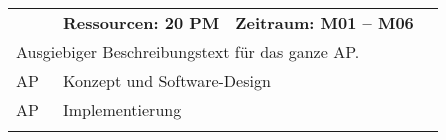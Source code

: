 \providecommand{\setTableCellSepWidth}{}\renewcommand{\setTableCellSepWidth}{\let\tableCellSepWidth\relax\newlength{\tableCellSepWidth}\setlength{\tableCellSepWidth}{\arrayrulewidth+2\tabcolsep}}
%
%
%
%
{%
\providecommand{\dispLhead}{}%
\providecommand{\dispThead}{}%
\providecommand{\dispNfo}{}%
\renewcommand{\dispLhead}[1]{\bfseries#1}%
\renewcommand{\dispThead}[1]{\color{white}\bfseries#1}%
\renewcommand{\dispNfo}[1]{\bfseries#1}%
%
%
%
%
%
%
%
%
%
\setlength{\tabcolsep}{4pt}%
\renewcommand{\arraystretch}{1.5}%
\renewcommand\theadfont{\bfseries}%
\arrayrulewidth=0.8pt%
%
\setlength{\extrarowheight}{0ex}%
\centering%
\footnotesize%
\edef\columnNumber{6}%
\setTableTextWidth{\tabletextw}{\columnNumber}%
%
%
\begin{longtable}{|p{0.08\tabletextw}|p{0.17\tabletextw}|p{0.15\tabletextw}|p{0.2\tabletextw}|p{0.2\tabletextw}|p{0.2\tabletextw}|}%
\hline%
\rowcolor{cell_Head}
	\multicolumn{\columnNumber}{|l|}{\dispThead{AP~\APnext: Konzept, Entwicklung \& Implementierung}}\\
\hline
\rowcolor{cell_accentuated}
	\multicolumn{2}{|p{0.3\tabletextwThree}|}{\dispNfo{AP-Leitung: DFKI}}&
	\multicolumn{2}{p{0.4\tabletextwThree}|}{\dispNfo{Ressourcen: 20 PM}}&
	\multicolumn{2}{p{0.3\tabletextwThree}|}{\dispNfo{Zeitraum: M01 -- M06}}\\
\hline
	\multicolumn{\columnNumber}{|p{\tabletextwOne}|}{Ausgiebiger Beschreibungstext für das ganze AP.}\\
\hline
\rowcolor{cell_accentuated}
	AP~\SubAPnext&
	\multicolumn{5}{l|}{Konzept und Software-Design}\\
\hline
	AP~\SubAPnext&
	\multicolumn{5}{l|}{Implementierung}\\
\hline%
\noalign{\vskip\doublerulesep}%
\hline%
\end{longtable}%
\let\dispLhead\undefined%
\let\dispThead\undefined%
}%
